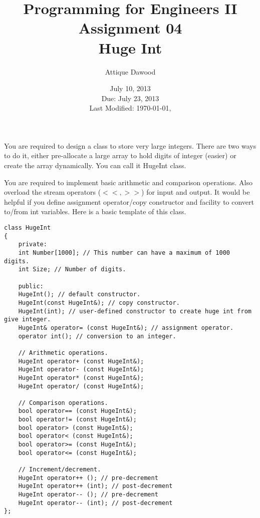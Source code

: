 \documentclass[12pt,a4paper]{article}
\title{\vspace{-2cm}Programming for Engineers II\\Assignment 04\\Huge Int}
\author{Attique Dawood}
\date{July 10, 2013\\Due: July 23, 2013\\[0.2cm] Last Modified: \today, \currenttime}
\begin{document}
\maketitle
You are required to design a class to store very large integers. There are two ways to do it, either pre-allocate a large array to hold digits of integer (easier) or create the array dynamically. You can call it HugeInt class.

You are required to implement basic arithmetic and comparison operations. Also overload the stream operators ($<<, >>$) for input and output. It would be helpful if you define assignment operator/copy constructor and facility to convert to/from int variables. Here is a basic template of this class.
\begin{lstlisting}
class HugeInt
{
    private:
    int Number[1000]; // This number can have a maximum of 1000 digits.
    int Size; // Number of digits.

    public:
    HugeInt(); // default constructor.
    HugeInt(const HugeInt&); // copy constructor.
    HugeInt(int); // user-defined constructor to create huge int from give integer.
    HugeInt& operator= (const HugeInt&); // assignment operator.
    operator int(); // conversion to an integer.

    // Arithmetic operations.
    HugeInt operator+ (const HugeInt&);
    HugeInt operator- (const HugeInt&);
    HugeInt operator* (const HugeInt&);
    HugeInt operator/ (const HugeInt&);

    // Comparison operations.
    bool operator== (const HugeInt&);
    bool operator!= (const HugeInt&);
    bool operator> (const HugeInt&);
    bool operator< (const HugeInt&);
    bool operator>= (const HugeInt&);
    bool operator<= (const HugeInt&);

    // Increment/decrement.
    HugeInt operator++ (); // pre-decrement
    HugeInt operator++ (int); // post-decrement
    HugeInt operator-- (); // pre-decrement
    HugeInt operator-- (int); // post-decrement
};
\end{lstlisting}
\end{document}
